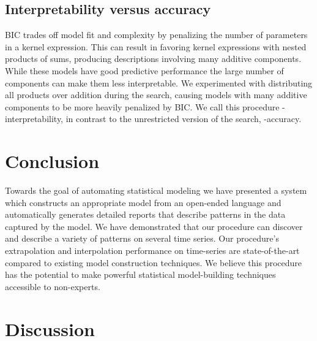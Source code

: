 \subsection{Interpretability versus accuracy}

BIC trades off model fit and complexity by penalizing the number of parameters in a kernel expression.
This can result in \procedurename{} favoring kernel expressions with nested products of sums, producing descriptions involving many additive components.
While these models have good predictive performance the large number of components can make them less interpretable.
We experimented with distributing all products over addition during the search, causing models with many additive components to be more heavily penalized by BIC.
We call this procedure \procedurename{}-interpretability, in contrast to the unrestricted version of the search, \procedurename{}-accuracy.






\section{Conclusion}

Towards the goal of automating statistical modeling we have presented a system which constructs an appropriate model from an open-ended language and automatically generates detailed reports that describe patterns in the data captured by the model.
We have demonstrated that our procedure can discover and describe a variety of patterns on several time series.
Our procedure's extrapolation and interpolation performance on time-series are state-of-the-art compared to existing model construction techniques.
We believe this procedure has the potential to make powerful statistical model-building techniques accessible to non-experts.










\section{Discussion}


